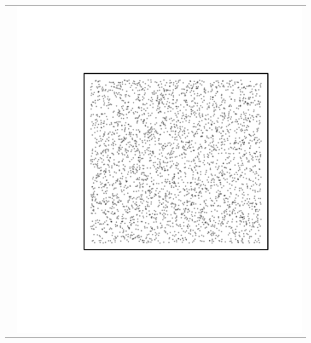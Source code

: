 \documentclass{article}\usepackage{graphicx, color}
\makeatletter
\def\maxwidth{ %
  \ifdim\Gin@nat@width>\linewidth
    \linewidth
  \else
    \Gin@nat@width
  \fi
}
\newenvironment{knitrout}{}{} %
\makeatother
\begin{document}
\begin{tabular}{cc}
&
\begin{knitrout}
\definecolor{shadecolor}{rgb}{0.969, 0.969, 0.969}\color{fgcolor}\includegraphics[width=\maxwidth]{figure/unnamed-chunk-30} 
\end{knitrout}

\\
\end{tabular}
\end{document}
